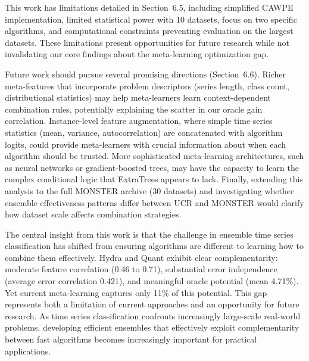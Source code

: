 \documentclass[pdflatex,sn-basic]{sn-jnl}           %
\theoremstyle{thmstyleone}%
\theoremstyle{thmstyletwo}%
\theoremstyle{thmstylethree}%
\begin{document}
This work has limitations detailed in Section~6.5, including simplified CAWPE implementation, limited statistical power with 10 datasets, focus on two specific algorithms, and computational constraints preventing evaluation on the largest datasets. These limitations present opportunities for future research while not invalidating our core findings about the meta-learning optimization gap.

Future work should pursue several promising directions (Section~6.6). Richer meta-features that incorporate problem descriptors (series length, class count, distributional statistics) may help meta-learners learn context-dependent combination rules, potentially explaining the scatter in our oracle gain correlation. Instance-level feature augmentation, where simple time series statistics (mean, variance, autocorrelation) are concatenated with algorithm logits, could provide meta-learners with crucial information about when each algorithm should be trusted. More sophisticated meta-learning architectures, such as neural networks or gradient-boosted trees, may have the capacity to learn the complex conditional logic that ExtraTrees appears to lack. Finally, extending this analysis to the full MONSTER archive (30 datasets) and investigating whether ensemble effectiveness patterns differ between UCR and MONSTER would clarify how dataset scale affects combination strategies.

The central insight from this work is that the challenge in ensemble time series classification has shifted from ensuring algorithms are different to learning how to combine them effectively. Hydra and Quant exhibit clear complementarity: moderate feature correlation (0.46 to 0.71), substantial error independence (average error correlation 0.421), and meaningful oracle potential (mean 4.71\%). Yet current meta-learning captures only 11\% of this potential. This gap represents both a limitation of current approaches and an opportunity for future research. As time series classification confronts increasingly large-scale real-world problems, developing efficient ensembles that effectively exploit complementarity between fast algorithms becomes increasingly important for practical applications. 

\backmatter

\clearpage
\end{document}
